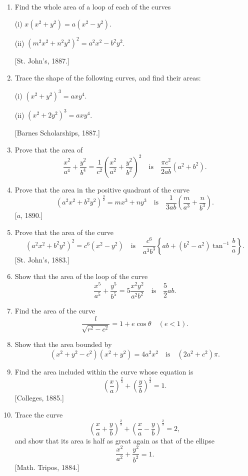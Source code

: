 \documentclass[11pt, a4paper]{article}
\newcommand{\source}[1]{\hfill\textnormal{[#1]}}
\begin{document}
\begin{enumerate}[leftmargin=2em]

\item Find the whole area of a loop of each of the curves

(i) $x(x^2+y^2)=a(x^2-y^2)$.

(ii) $(m^2x^2+n^2y^2)^2=a^2x^2-b^2y^2$.

\source{St. John's, 1887.}

\item Trace the shape of the following curves, and find their areas:

(i) $(x^2+y^2)^3=axy^4$.

(ii) $(x^2+2y^2)^3=axy^4$.

\source{Barnes Scholarships, 1887.}

\item Prove that the area of
\[
\frac{x^2}{a^4}+\frac{y^2}{b^4}=\frac{1}{c^2}\left(\frac{x^2}{a^2}+\frac{y^2}{b^2}\right)^2\quad\text{is}\quad\frac{\pi c^2}{2ab}(a^2+b^2).
\]

\item Prove that the area in the positive quadrant of the curve
\[
(a^2x^2+b^2y^2)^{\frac32}=mx^3+ny^3\quad\text{is}\quad\frac{1}{3ab}\left(\frac{m}{a^3}+\frac{n}{b^3}\right).
\]
\source{$a$, 1890.}

\item Prove that the area of the curve
\[
(a^2x^2+b^2y^2)^2=c^6(x^2-y^2)\quad\text{is}\quad\frac{c^6}{a^3b^3}\left\{ab+(b^2-a^2)\tan^{-1}\frac{b}{a}\right\}.
\]
\source{St. John's, 1883.}

\item Show that the area of the loop of the curve
\[
\frac{x^5}{a^5}+\frac{y^5}{b^5}=5\frac{x^2y^2}{a^2b^2}\quad\text{is}\quad\frac52ab.
\]

\item Find the area of the curve
\[
\frac{l}{\sqrt{r^2-c^2}}=1+e\cos\theta\quad(e<1).
\]

\item Show that the area bounded by
\[
(x^2+y^2-c^2)(x^2+y^2)=4a^2x^2\quad\text{is}\quad(2a^2+c^2)\pi.
\]

\item Find the area included within the curve whose equation is
\[
\left(\frac{x}{a}\right)^{\frac23}+\left(\frac{y}{b}\right)^{\frac23}=1.
\]
\source{Colleges, 1885.}

\item Trace the curve
\[
\left(\frac{x}{a}+\frac{y}{b}\right)^{\frac23}+\left(\frac{x}{a}-\frac{y}{b}\right)^{\frac23}=2,
\]
and show that its area is half as great again as that of the ellipse
\[
\frac{x^2}{a^2}+\frac{y^2}{b^2}=1.
\]
\source{Math. Tripos, 1884.}


\end{enumerate}
\end{document}
